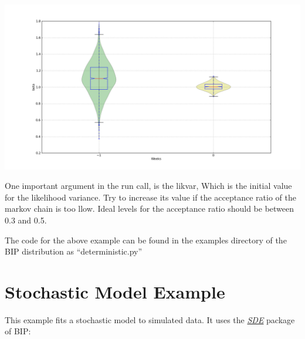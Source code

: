 \documentclass[a4paper,10pt,english]{manual}
\begin{document}
\includegraphics[width=15cm]{fit_par.png}

One important argument in the run call, is the likvar, Which is the initial value for the likelihood variance. Try to increase its value if the acceptance ratio of the markov chain is too llow. Ideal levels for the acceptance ratio should be between 0.3 and 0.5.

The code for the above example can be found in the examples directory of the BIP distribution as ``deterministic.py''


\section{Stochastic Model Example}

This example fits a stochastic model to simulated data. It uses the \hyperlink{sde}{\emph{SDE}} package of BIP:
\end{document}
